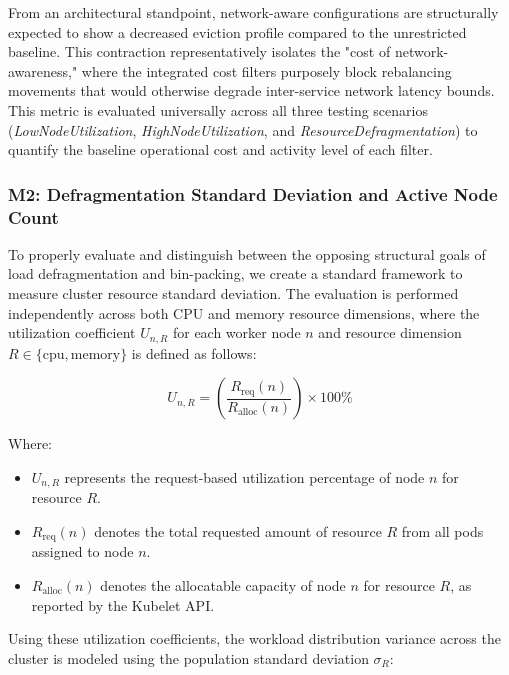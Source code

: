 From an architectural standpoint, network-aware configurations are structurally expected to show a decreased eviction profile compared to the unrestricted baseline. This contraction representatively isolates the "cost of network-awareness," where the integrated cost filters purposely block rebalancing movements that would otherwise degrade inter-service network latency bounds. This metric is evaluated universally across all three testing scenarios (\textit{LowNodeUtilization}, \textit{HighNodeUtilization}, and \textit{ResourceDefragmentation}) to quantify the baseline operational cost and activity level of each filter.

\subsubsection{M2: Defragmentation Standard Deviation and Active Node Count}
\label{subsubsec:netaware4_evaluationmetrics2}
To properly evaluate and distinguish between the opposing structural goals of load defragmentation and bin-packing, we create a standard framework to measure cluster resource standard deviation. The evaluation is performed independently across both CPU and memory resource dimensions, where the utilization coefficient \(U_{n,R}\) for each worker node \(n\) and resource dimension \(R \in \{\text{cpu}, \text{memory}\}\) is defined as follows:

\[
U_{n,R}
=
\left(
\frac{R_{\text{req}}(n)}
{R_{\text{alloc}}(n)}
\right)
\times 100\%
\]

Where:

\begin{itemize}
    \item \(U_{n,R}\) represents the request-based utilization percentage of node \(n\) for resource \(R\).

    \item \(R_{\text{req}}(n)\) denotes the total requested amount of resource \(R\) from all pods assigned to node \(n\).

    \item \(R_{\text{alloc}}(n)\) denotes the allocatable capacity of node \(n\) for resource \(R\), as reported by the Kubelet API.
\end{itemize}

Using these utilization coefficients, the workload distribution variance across the cluster is modeled using the population standard deviation \(\sigma_R\):

